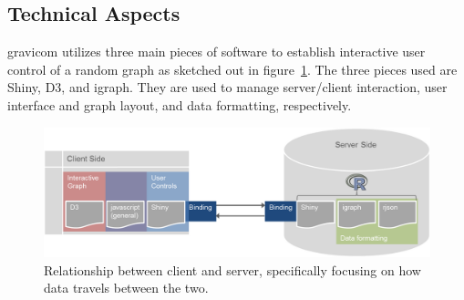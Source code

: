 \documentclass{article}\usepackage[]{graphicx}\usepackage[]{color}
\begin{document}


\subsection{Technical Aspects}

gravicom utilizes three main pieces of software to establish interactive user control of a random graph as sketched out in figure~\ref{fig:clientserver}. The three pieces used are Shiny, D3, and igraph. They are used to manage server/client interaction, user interface and graph layout, and data formatting, respectively.

\begin{figure}[H]
\centering
\includegraphics[width=\textwidth]{images/clientserverflow.png}
\caption{\label{fig:clientserver} Relationship between client and server, specifically focusing on how data travels between the two.}
\end{figure}
\end{document}
